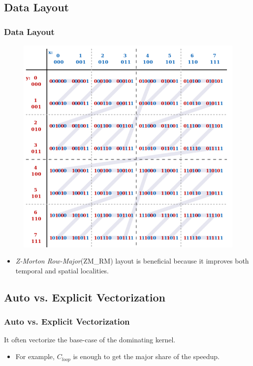 \subsection{Data Layout}
\begin{frame}
    \frametitle{Data Layout}
	\begin{figure}
		\includegraphics[scale=0.2]{figure/fig-z-morton.png}
	\end{figure}
	\begin{itemize}
		\item \textit{Z-Morton Row-Major}(ZM\_RM) layout is beneficial because
			it improves both temporal and spatial localities.
	\end{itemize}
\end{frame}

\subsection{Auto vs. Explicit Vectorization}
\begin{frame}
    \frametitle{Auto vs. Explicit Vectorization}
    It often vectorize the base-case of the dominating kernel.
	\begin{itemize}
		\item For example, $C_{\textit{loop}}$ is enough to get the 
			major share of the speedup.
	\end{itemize}
\end{frame}